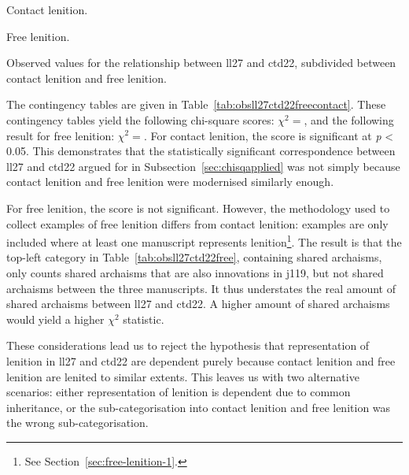\begin{table}[h]
  \begin{subtable}[b]{0.5\linewidth}
    \centering
    
    \caption{Contact lenition.}
    \label{tab:contactlentab}
  \end{subtable}%
  \begin{subtable}[b]{0.5\linewidth}
    \centering
    
    \caption{Free lenition.}
    \label{tab:obsll27ctd22free}
  \end{subtable}
  \caption{Observed values for the relationship between \gls{ll27} and \gls{ctd22}, subdivided between contact lenition and free lenition.}
  \label{tab:obsll27ctd22freecontact}
\end{table}

The contingency tables are given in Table~\ref{tab:obsll27ctd22freecontact}. These contingency tables yield the following chi-square scores: \(\chi^2 = \), and the following result for free lenition: \(\chi^2 = \). For contact lenition, the score is significant at \emph{p} < 0.05. This demonstrates that the statistically significant correspondence between \gls{ll27} and \gls{ctd22} argued for in Subsection~\ref{sec:chisqapplied} was not simply because contact lenition and free lenition were modernised similarly enough. 

For free lenition, the score is not significant. However, the methodology used to collect examples of free lenition differs from contact lenition: examples are only included where at least one manuscript represents lenition\footnote{See Section~\ref{sec:free-lenition-1}.}. The result is that the top-left category in Table~\ref{tab:obsll27ctd22free}, containing shared archaisms, only counts shared archaisms that are also innovations in \gls{j119}, but not shared archaisms between the three manuscripts. It thus understates the real amount of shared archaisms between \gls{ll27} and \gls{ctd22}. A higher amount of shared archaisms would yield a higher \(\chi^2\) statistic.

These considerations lead us to reject the hypothesis that representation of lenition in \gls{ll27} and \gls{ctd22} are dependent purely because contact lenition and free lenition are lenited to similar extents. This leaves us with two alternative scenarios: either representation of lenition is dependent due to common inheritance, or the sub-categorisation into contact lenition and free lenition was the wrong sub-categorisation.

